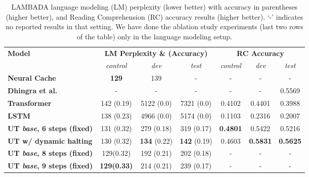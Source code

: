 \begin{table}[t!]
\centering
    \caption{LAMBADA language modeling (LM) perplexity (lower better) with accuracy in parentheses (higher better), and Reading Comprehension (RC) accuracy results (higher better). `-' indicates no reported results in that setting. We have done the ablation study experiments (last two rows of the table) only in the language modeling setup.}
    \begin{adjustbox}{max width=\textwidth}
    \begin{tabular}{lcccccc}
    \toprule
    \multirow{2}{*}{ \bf Model } & \multicolumn{3}{c}{\bf LM Perplexity \& (Accuracy) } & \multicolumn{3}{c}{\bf RC Accuracy } \\ \cmidrule(l{2pt}r{2pt}){2-4} \cmidrule(l{2pt}r{2pt}){5-7}
    & \textit{control} & \textit{dev} & \textit{test} & \textit{control} & \textit{dev} & \textit{test} \\ \midrule
    \bf Neural Cache~\citep{grave2016improving} & {\bf 129} & 139 & - & - & - & - \\ 
    \bf Dhingra et al.~\cite{dhingra2018neural} & - & - & - & - & - & 0.5569 \\ \midrule
    \bf Transformer & 142 (0.19) & 5122 (0.0) & 7321 (0.0) & 
    0.4102 & 0.4401 & 0.3988 \\
    \bf LSTM & 138 (0.23) & 4966 (0.0) & 5174 (0.0) & 0.1103 & 0.2316 & 0.2007 \\
    \bf UT \emph{base}, 6 steps (fixed) & 131 (0.32) & 279 (0.18) & 319 (0.17) & {\bf 0.4801} & 0.5422 & 0.5216 \\
    \bf UT w/ dynamic halting & 130 (0.32) & {\bf 134} (0.22) & {\bf 142} (0.19) & 0.4603 & {\bf 0.5831} & {\bf 0.5625} \\ \midrule
    \bf UT \emph{base}, 8 steps (fixed) & 129(0.32) & 192 (0.21) & 202 (0.18) & - & - & - \\
    \bf UT \emph{base}, 9 steps (fixed) & \textbf{129(0.33)} & 214 (0.21) & 239 (0.17) & - & - & - \\
 \bottomrule
    \end{tabular}
    \end{adjustbox}
    \label{tab:lambada}
\end{table}